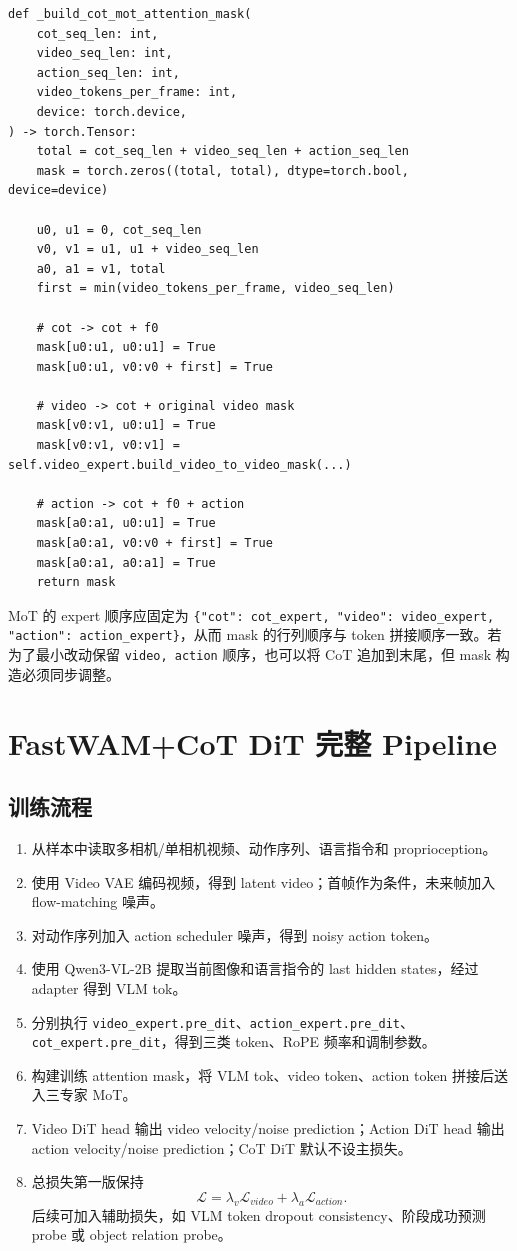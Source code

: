 \documentclass[UTF8,a4paper,11pt]{ctexart}
\begin{document}
\begin{verbatim}
def _build_cot_mot_attention_mask(
    cot_seq_len: int,
    video_seq_len: int,
    action_seq_len: int,
    video_tokens_per_frame: int,
    device: torch.device,
) -> torch.Tensor:
    total = cot_seq_len + video_seq_len + action_seq_len
    mask = torch.zeros((total, total), dtype=torch.bool, device=device)

    u0, u1 = 0, cot_seq_len
    v0, v1 = u1, u1 + video_seq_len
    a0, a1 = v1, total
    first = min(video_tokens_per_frame, video_seq_len)

    # cot -> cot + f0
    mask[u0:u1, u0:u1] = True
    mask[u0:u1, v0:v0 + first] = True

    # video -> cot + original video mask
    mask[v0:v1, u0:u1] = True
    mask[v0:v1, v0:v1] = self.video_expert.build_video_to_video_mask(...)

    # action -> cot + f0 + action
    mask[a0:a1, u0:u1] = True
    mask[a0:a1, v0:v0 + first] = True
    mask[a0:a1, a0:a1] = True
    return mask
\end{verbatim}

MoT 的 expert 顺序应固定为 \texttt{\{"cot": cot\_expert, "video": video\_expert, "action": action\_expert\}}，从而 mask 的行列顺序与 token 拼接顺序一致。若为了最小改动保留 \texttt{video, action} 顺序，也可以将 CoT 追加到末尾，但 mask 构造必须同步调整。

\section{FastWAM+CoT DiT 完整 Pipeline}

\subsection{训练流程}

\begin{enumerate}[leftmargin=1.8em]
  \item 从样本中读取多相机/单相机视频、动作序列、语言指令和 proprioception。
  \item 使用 Video VAE 编码视频，得到 latent video；首帧作为条件，未来帧加入 flow-matching 噪声。
  \item 对动作序列加入 action scheduler 噪声，得到 noisy action token。
  \item 使用 Qwen3-VL-2B 提取当前图像和语言指令的 last hidden states，经过 adapter 得到 VLM tok。
  \item 分别执行 \texttt{video\_expert.pre\_dit}、\texttt{action\_expert.pre\_dit}、\texttt{cot\_expert.pre\_dit}，得到三类 token、RoPE 频率和调制参数。
  \item 构建训练 attention mask，将 VLM tok、video token、action token 拼接后送入三专家 MoT。
  \item Video DiT head 输出 video velocity/noise prediction；Action DiT head 输出 action velocity/noise prediction；CoT DiT 默认不设主损失。
  \item 总损失第一版保持
  \[
  \mathcal{L}=\lambda_v\mathcal{L}_{video}+\lambda_a\mathcal{L}_{action}.
  \]
  后续可加入辅助损失，如 VLM token dropout consistency、阶段成功预测 probe 或 object relation probe。
\end{enumerate}
\end{document}
